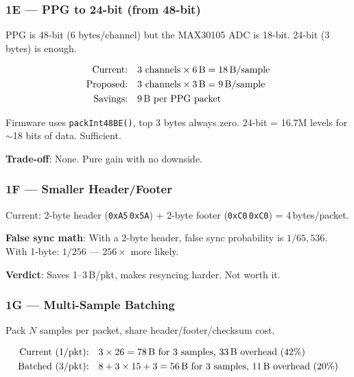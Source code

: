\documentclass[11pt,a4paper]{article}
\newcommand{\hexval}[1]{\texttt{0x#1}}
\begin{document}
\subsubsection{1E --- PPG to 24-bit (from 48-bit)}

PPG is 48-bit (6 bytes/channel) but the MAX30105 ADC is 18-bit. 24-bit (3 bytes) is enough.

\begin{align}
\text{Current:} \quad & 3 \text{ channels} \times 6 \text{\,B} = 18 \text{\,B/sample} \nonumber\\
\text{Proposed:} \quad & 3 \text{ channels} \times 3 \text{\,B} = 9 \text{\,B/sample} \nonumber\\
\text{Savings:} \quad & 9 \text{\,B per PPG packet} \nonumber
\end{align}

Firmware uses \texttt{packInt48BE()}, top 3 bytes always zero. 24-bit = 16.7M levels for ${\sim}$18 bits of data. Sufficient.

\textbf{Trade-off}: None. Pure gain with no downside.

\subsubsection{1F --- Smaller Header/Footer}

Current: 2-byte header (\hexval{A5}\,\hexval{5A}) + 2-byte footer (\hexval{C0}\,\hexval{C0}) = 4\,bytes/packet.

\textbf{False sync math}: With a 2-byte header, false sync probability is $1/65{,}536$. With 1-byte: $1/256$ --- $256\times$ more likely.

\textbf{Verdict}: Saves 1--3\,B/pkt, makes resyncing harder. Not worth it.

\subsubsection{1G --- Multi-Sample Batching}

Pack $N$ samples per packet, share header/footer/checksum cost.

\begin{align}
\text{Current (1/pkt):} \quad & 3 \times 26 = 78 \text{\,B for 3 samples, 33\,B overhead (42\%)} \nonumber\\
\text{Batched (3/pkt):} \quad & 8 + 3 \times 15 + 3 = 56 \text{\,B for 3 samples, 11\,B overhead (20\%)} \nonumber
\end{align}
\end{document}
